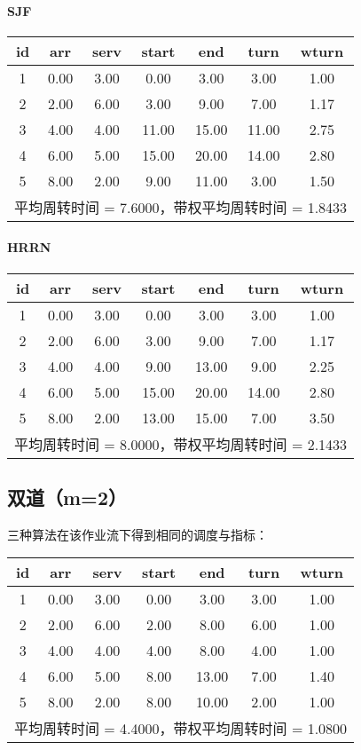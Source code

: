 \documentclass[12pt,hyperref,a4paper,UTF8]{ctexart}
\begin{document}
\paragraph{SJF}
\begin{table}[!htbp]
\centering
\begin{tabular}{c|c|c|c|c|c|c}
id & arr & serv & start & end & turn & wturn \\
\hline
1 & 0.00 & 3.00 & 0.00 & 3.00 & 3.00 & 1.00 \\
2 & 2.00 & 6.00 & 3.00 & 9.00 & 7.00 & 1.17 \\
3 & 4.00 & 4.00 & 11.00 & 15.00 & 11.00 & 2.75 \\
4 & 6.00 & 5.00 & 15.00 & 20.00 & 14.00 & 2.80 \\
5 & 8.00 & 2.00 & 9.00 & 11.00 & 3.00 & 1.50 \\
\hline
\multicolumn{7}{r}{\small 平均周转时间 = 7.6000，带权平均周转时间 = 1.8433}
\end{tabular}
\end{table}

\paragraph{HRRN}
\begin{table}[!htbp]
\centering
\begin{tabular}{c|c|c|c|c|c|c}
id & arr & serv & start & end & turn & wturn \\
\hline
1 & 0.00 & 3.00 & 0.00 & 3.00 & 3.00 & 1.00 \\
2 & 2.00 & 6.00 & 3.00 & 9.00 & 7.00 & 1.17 \\
3 & 4.00 & 4.00 & 9.00 & 13.00 & 9.00 & 2.25 \\
4 & 6.00 & 5.00 & 15.00 & 20.00 & 14.00 & 2.80 \\
5 & 8.00 & 2.00 & 13.00 & 15.00 & 7.00 & 3.50 \\
\hline
\multicolumn{7}{r}{\small 平均周转时间 = 8.0000，带权平均周转时间 = 2.1433}
\end{tabular}
\end{table}

\subsection{双道（m=2）}
三种算法在该作业流下得到相同的调度与指标：
\begin{table}[!htbp]
\centering
\begin{tabular}{c|c|c|c|c|c|c}
id & arr & serv & start & end & turn & wturn \\
\hline
1 & 0.00 & 3.00 & 0.00 & 3.00 & 3.00 & 1.00 \\
2 & 2.00 & 6.00 & 2.00 & 8.00 & 6.00 & 1.00 \\
3 & 4.00 & 4.00 & 4.00 & 8.00 & 4.00 & 1.00 \\
4 & 6.00 & 5.00 & 8.00 & 13.00 & 7.00 & 1.40 \\
5 & 8.00 & 2.00 & 8.00 & 10.00 & 2.00 & 1.00 \\
\hline
\multicolumn{7}{r}{\small 平均周转时间 = 4.4000，带权平均周转时间 = 1.0800}
\end{tabular}
\end{table}
\end{document}
